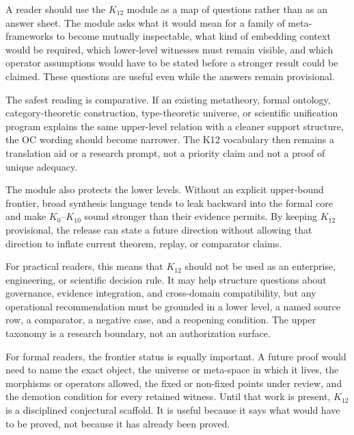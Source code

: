 A reader should use the \(K_{12}\) module as a map of questions rather than as
an answer sheet. The module asks what it would mean for a family of
meta-frameworks to become mutually inspectable, what kind of embedding context
would be required, which lower-level witnesses must remain visible, and which
operator assumptions would have to be stated before a stronger result could be
claimed. These questions are useful even while the answers remain provisional.

The safest reading is comparative. If an existing metatheory, formal ontology,
category-theoretic construction, type-theoretic universe, or scientific
unification program explains the same upper-level relation with a cleaner
support structure, the OC wording should become narrower. The K12 vocabulary
then remains a translation aid or a research prompt, not a priority claim and
not a proof of unique adequacy.

The module also protects the lower levels. Without an explicit upper-bound
frontier, broad synthesis language tends to leak backward into the formal core
and make \(K_0\)--\(K_{10}\) sound stronger than their evidence permits. By
keeping \(K_{12}\) provisional, the release can state a future direction
without allowing that direction to inflate current theorem, replay, or
comparator claims.

For practical readers, this means that \(K_{12}\) should not be used as an
enterprise, engineering, or scientific decision rule. It may help structure
questions about governance, evidence integration, and cross-domain
compatibility, but any operational recommendation must be grounded in a lower
level, a named source row, a comparator, a negative case, and a reopening
condition. The upper taxonomy is a research boundary, not an authorization
surface.

For formal readers, the frontier status is equally important. A future proof
would need to name the exact object, the universe or meta-space in which it
lives, the morphisms or operators allowed, the fixed or non-fixed points under
review, and the demotion condition for every retained witness. Until that
work is present, \(K_{12}\) is a disciplined conjectural scaffold. It is useful
because it says what would have to be proved, not because it has already been
proved.

